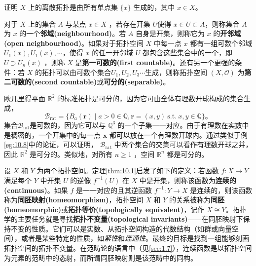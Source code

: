 \begin{exercise}
	证明 $X$ 上的离散拓扑是由所有单点集 $\{x\}$ 生成的，其中 $x\in X$。
\end{exercise}

	对于 $X$ 上的集合 $A$ 与某点 $x\in X$ ，若存在开集 $U$使得 $x\in U\subset A$，则称集合 $A$ 为 $x$ 的一个\textbf{邻域(neighbourhood)}。若 $A$ 自身是开集，则称它为 $x$ 的\textbf{开邻域(open neighbourhood)}。如果对于拓扑空间 $X$ 中每一点 $x$ 都有一组可数个邻域 $U_{1}( x) ,U_{1}( x) ,\cdots $，使得 $x$ 的任一开邻域 $U$ 都包含这些集合中的一个，即 $U\supset U_{n}( x)$ ，则称 $X$ 是\textbf{第一可数的(first countable)}。还有另一个更强的条件：若 $X$ 的拓扑可以由可数个集合$U_{1} ,U_{2} ,U_{3} \cdots $生成，则称拓扑空间 $( X,\mathcal{O})$ 为\textbf{第二可数的(second countable)}或\textbf{可分的(separable)}。

\begin{eg}\label{eg:10.9}
	欧几里得平面 $\mathbb{R}^{2}$ 的标准拓扑是可分的，因为它可由全体有理数开球构成的集合生成，
\begin{equation*}
    \mathcal{B}_{\mathrm{rat}} =\{B_{a} (\mathbf{r} )\mid a >0\in \mathbb{Q} ,\mathbf{r} =( x,y) \ \mathrm{s.t.} \ x,y\in \mathbb{Q} \}。
\end{equation*}
集合$\mathcal{B}_{\mathrm{rat}}$是可数的，因为它可以与 $\mathbb{Q}^{3}$ 的一个子集一一对应。由于有理数在实数中是稠密的，一个开集中的每一点 $\mathbf{x}$ 都可以放在一个有理数开球内。通过类似于例\ref{eg:10.8}中的论证，可以证明， $\mathcal{B}_{\mathrm{rat}}$ 中两个集合的交集可以看作有理数开球之并，因此 $\mathbb{R}^{2}$ 是可分的。类似地，对所有 $n\geq 1$ ，空间 $\mathbb{R}^{n}$ 都是可分的。
\end{eg}

	设 $X$ 和 $Y$ 为两个拓扑空间。定理\ref{thm:10.1}启发了如下的定义：若函数 $f:X\rightarrow Y$ 满足每个 $Y$ 中开集 $U$ 的逆像 $f^{-1} (U)$ 在 $X$ 中是开集，则称该函数为\textbf{连续的(continuous)}。如果 $f$ 是一一对应的且其逆函数 $f^{-1} :Y\rightarrow X$ 是连续的，则该函数称为\textbf{同胚映射(homeomorphism)}，拓扑空间 $X$ 和 $Y$ 的关系被称为\textbf{同胚(homeomorphic)}或\textbf{拓扑等价(topologically equivalent)}，记作 $X\cong Y$。拓扑学的主要任务就是寻找\textbf{拓扑不变量(topological invariants)}——在同胚映射下保持不变的性质。它们可以是实数、从拓扑空间构造的代数结构（如群或向量空间），或者是某些特定的性质，如\emph{紧性}和\emph{连通性}。最终的目标是找到一组能够刻画拓扑空间的拓扑不变量。在范畴论的语言中（见\ref{sec:1.7}），连续函数是以拓扑空间为元素的范畴中的态射，而所谓同胚映射则是该范畴中的同构。

